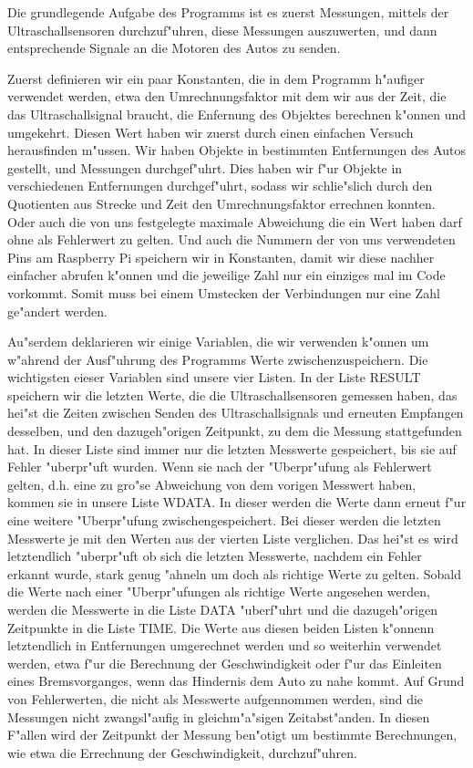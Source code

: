 \documentclass[a4paper,12pt]{article}
\begin{document}
Die grundlegende Aufgabe des Programms ist es zuerst Messungen, mittels der Ultraschallsensoren durchzuf"uhren, diese Messungen auszuwerten, und dann entsprechende Signale an die Motoren des Autos zu senden.

\medskip

Zuerst definieren wir ein paar Konstanten, die in dem Programm h"aufiger verwendet werden, etwa den Umrechnungsfaktor mit dem wir aus der Zeit, die das Ultraschallsignal braucht, die Enfernung des Objektes berechnen k"onnen und umgekehrt.
Diesen Wert haben wir zuerst durch einen einfachen Versuch herausfinden m"ussen. Wir haben Objekte in bestimmten Entfernungen des Autos gestellt, und Messungen durchgef"uhrt.
Dies haben wir f"ur Objekte in verschiedenen Entfernungen durchgef"uhrt, sodass wir schlie"slich durch den Quotienten aus Strecke und Zeit den Umrechnungsfaktor errechnen konnten.
Oder auch die von uns festgelegte maximale Abweichung die ein Wert haben darf ohne als Fehlerwert zu gelten.
Und auch die Nummern der von uns verwendeten Pins am Raspberry Pi speichern wir in Konstanten, damit wir diese nachher einfacher abrufen k"onnen und die jeweilige Zahl nur ein einziges mal im Code vorkommt.
Somit muss bei einem Umstecken der Verbindungen nur eine Zahl ge"andert werden.

Au"serdem deklarieren wir einige Variablen, die wir verwenden k"onnen um w"ahrend der Ausf"uhrung des Programms Werte zwischenzuspeichern.
Die wichtigsten eieser Variablen sind unsere vier Listen.
In der Liste RESULT speichern wir die letzten Werte, die die Ultraschallsensoren gemessen haben, das hei"st die Zeiten zwischen Senden des Ultraschallsignals und erneuten Empfangen desselben, und den dazugeh"origen Zeitpunkt, zu dem die Messung stattgefunden hat.
In dieser Liste sind immer nur die letzten Messwerte gespeichert, bis sie auf Fehler "uberpr"uft wurden.
Wenn sie nach der "Uberpr"ufung als Fehlerwert gelten, d.h. eine zu gro"se Abweichung von dem vorigen Messwert haben, kommen sie in unsere Liste WDATA.
In dieser werden die Werte dann erneut f"ur eine weitere "Uberpr"ufung zwischengespeichert.
Bei dieser werden die letzten Messwerte je mit den Werten aus der vierten Liste verglichen.
Das hei"st es wird letztendlich "uberpr"uft ob sich die letzten Messwerte, nachdem ein Fehler erkannt wurde, stark genug "ahneln um doch als richtige Werte zu gelten.
Sobald die Werte nach einer "Uberpr"ufungen als richtige Werte angesehen werden, werden die Messwerte in die Liste DATA "uberf"uhrt und die dazugeh"origen Zeitpunkte in die Liste TIME.
Die Werte aus diesen beiden Listen k"onnenn letztendlich in Entfernungen umgerechnet werden und so weiterhin verwendet werden, etwa f"ur die Berechnung der Geschwindigkeit oder f"ur das Einleiten eines Bremsvorganges, wenn das Hindernis dem Auto zu nahe kommt.
Auf Grund von Fehlerwerten, die nicht als Messwerte aufgennommen werden, sind die Messungen nicht zwangsl"aufig in gleichm"a"sigen Zeitabst"anden. In diesen F"allen wird der Zeitpunkt der Messung ben"otigt um bestimmte Berechnungen, wie etwa die Errechnung der Geschwindigkeit, durchzuf"uhren.
\end{document}
